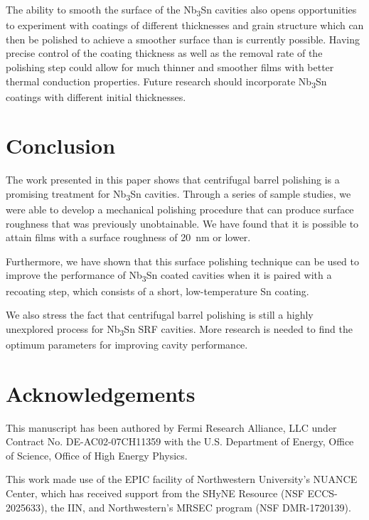 \documentclass[reprint,amsmath,amssymb,aps]{revtex4-2}%
\begin{document}
The ability to smooth the surface of the Nb\textsubscript{3}Sn cavities also opens opportunities to experiment with coatings of different thicknesses and grain structure which can then be polished to achieve a smoother surface than is currently possible. Having precise control of the coating thickness as well as the removal rate of the polishing step could allow for much thinner and smoother films with better thermal conduction properties. Future research should incorporate Nb\textsubscript{3}Sn coatings with different initial thicknesses.

%
\section{Conclusion}%
\label{sec:Conclusion}%
The work presented in this paper shows that centrifugal barrel polishing is a promising treatment for Nb\textsubscript{3}Sn cavities. Through a series of sample studies, we were able to develop a mechanical polishing procedure that can produce surface roughness that was previously unobtainable. We have found that it is possible to attain films with a surface roughness of 20~nm or lower. 

Furthermore, we have shown that this surface polishing technique can be used to improve the performance of Nb\textsubscript{3}Sn coated cavities when it is paired with a recoating step, which consists of a short, low-temperature Sn coating.

We also stress the fact that centrifugal barrel polishing is still a highly unexplored process for Nb\textsubscript{3}Sn SRF cavities. More research is needed to find the optimum parameters for improving cavity performance.

\section{Acknowledgements}
\label{sec:acknowledgements}
This manuscript has been authored by Fermi Research Alliance, LLC under Contract No. DE-AC02-07CH11359 with the U.S. Department of Energy, Office of Science, Office of High Energy Physics.

This work made use of the EPIC facility of Northwestern University’s NUANCE Center, which has received support from the SHyNE Resource (NSF ECCS-2025633), the IIN, and Northwestern's MRSEC program (NSF DMR-1720139).

%
%
\end{document}
